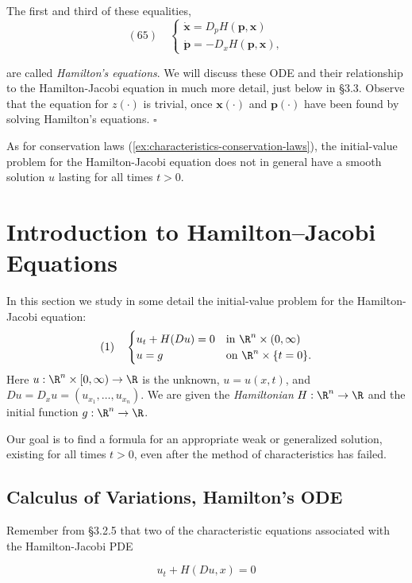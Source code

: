 \begin{example}
The first and third of these equalities,
$$
(65) \quad
\begin{cases}
\dot{\mathbf{x}} = D_p H(\mathbf{p}, \mathbf{x}) \\
\dot{\mathbf{p}} = -D_x H(\mathbf{p}, \mathbf{x}),
\end{cases}
$$

are called \textit{Hamilton's equations}. We will discuss these ODE and their relationship to the Hamilton-Jacobi equation in much more detail, just below in \S 3.3. Observe that the equation for $z(\cdot)$ is trivial, once $\mathbf{x}(\cdot)$ and $\mathbf{p}(\cdot)$ have been found by solving Hamilton's equations. $\square$

As for conservation laws (\cref{ex:characteristics-conservation-laws}), the initial-value problem for the Hamilton-Jacobi equation does not in general have a smooth solution $u$ lasting for all times $t > 0$.
\end{example}

\section{Introduction to Hamilton--Jacobi Equations}
\label{sec:hamilton-jacobi-intro}

In this section we study in some detail the initial-value problem for the Hamilton-Jacobi equation:
$$
(1) \quad
\begin{cases}
u_t + H(Du) = 0 & \text{in } \R^n \times (0, \infty) \\
u = g & \text{on } \R^n \times \{t = 0\}.
\end{cases}
$$
Here $u : \R^n \times [0, \infty) \to \R$ is the unknown, $u = u(x, t)$, and $Du = D_x u = (u_{x_1}, \ldots, u_{x_n})$. We are given the \textit{Hamiltonian} $H : \R^n \to \R$ and the initial function $g : \R^n \to \R$.

Our goal is to find a formula for an appropriate weak or generalized solution, existing for all times $t > 0$, even after the method of characteristics has failed.

\subsection{Calculus of Variations, Hamilton's ODE}
\label{sec:calculus-of-variations-hamiltons-ode}

Remember from \S 3.2.5 that two of the characteristic equations associated with the Hamilton-Jacobi PDE

$$u_t + H(Du, x) = 0$$

